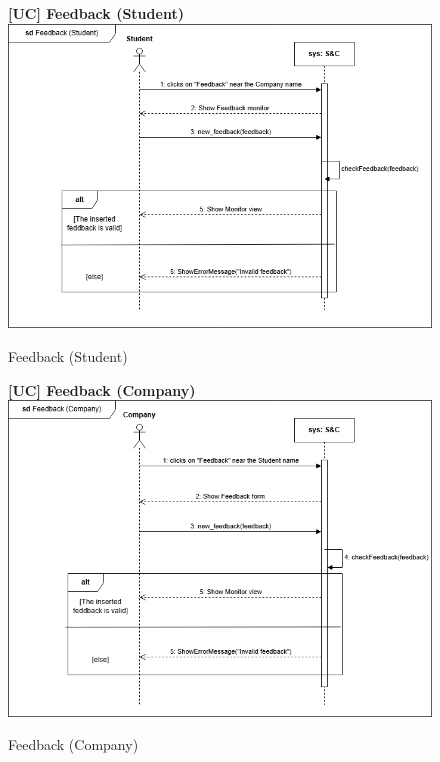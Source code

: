 \begin{figure}[H]
\textbf{[UC\nextUCDiagr] Feedback (Student)}\newline\newline
    \includegraphics[width=15cm]{Images/UC_diagram/RASD-UC26.drawio.png}
    \caption{Feedback (Student)}
\end{figure}

\begin{figure}[H]
\textbf{[UC\nextUCDiagr] Feedback (Company)}\newline\newline
    \includegraphics[width=15cm]{Images/UC_diagram/RASD-UC25.drawio.png}
    \caption{Feedback (Company)}
\end{figure}

